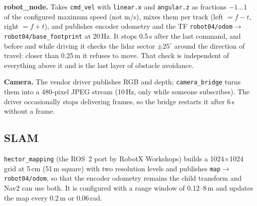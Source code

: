 \documentclass[10pt,twocolumn]{article}
\begin{document}
\textbf{robot\_node.} Takes \texttt{cmd\_vel} with \texttt{linear.x} and \texttt{angular.z} as
fractions $-1\ldots1$ of the configured maximum speed (not m/s), mixes them per track
(left $= f - t$, right $= f + t$), and publishes encoder odometry and the TF
\texttt{robot04/odom}$\to$\texttt{robot04/base\_footprint} at 20\,Hz. It stops 0.5\,s after the
last command, and before and while driving it checks the lidar sector $\pm25^\circ$ around the
direction of travel: closer than 0.25\,m it refuses to move. That check is independent of
everything above it and is the last layer of obstacle avoidance.

\textbf{Camera.} The vendor driver publishes RGB and depth; \texttt{camera\_bridge} turns them
into a 480-pixel JPEG stream (10\,Hz, only while someone subscribes). The driver occasionally
stops delivering frames, so the bridge restarts it after 6\,s without a frame.

\subsection{SLAM}
\texttt{hector\_mapping} (the ROS~2 port by RobotX Workshops) builds a 1024$\times$1024 grid at
5\,cm (51\,m square) with two resolution levels and publishes \texttt{map}$\to$\texttt{robot04/odom},
so that the encoder odometry remains the child transform and Nav2 can use both. It is configured
with a range window of 0.12--8\,m and updates the map every 0.2\,m or 0.06\,rad.
\end{document}
